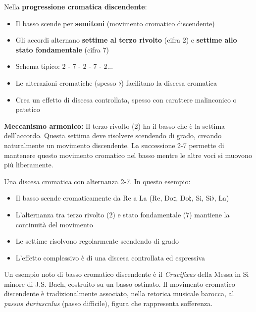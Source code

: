 \begin{regola}
	\label{reg:progressione_cromatica_disc}
	Nella \textbf{progressione cromatica discendente}:
	
	\begin{itemize}
		\item Il basso scende per \textbf{semitoni} (movimento cromatico discendente)
		\item Gli accordi alternano \textbf{settime al terzo rivolto} (cifra 2) e \textbf{settime allo stato fondamentale} (cifra 7)
		\item Schema tipico: 2 - 7 - 2 - 7 - 2...
		\item Le alterazioni cromatiche (spesso $\flat$) facilitano la discesa cromatica
		\item Crea un effetto di discesa controllata, spesso con carattere malinconico o patetico
	\end{itemize}
	
	\textbf{Meccanismo armonico:}
	Il terzo rivolto (2) ha il basso che è la settima dell'accordo. Questa settima deve risolvere scendendo di grado, creando naturalmente un movimento discendente. La successione 2-7 permette di mantenere questo movimento cromatico nel basso mentre le altre voci si muovono più liberamente.
\end{regola}

\begin{esempio}
	\label{ex:progressione_cromatica_disc}
	Una discesa cromatica con alternanza 2-7.
	In questo esempio:
	\begin{itemize}
		\item Il basso scende cromaticamente da Re a La (Re, Do$\sharp$, Do$\natural$, Si, Si$\flat$, La)
		\item L'alternanza tra terzo rivolto (2) e stato fondamentale (7) mantiene la continuità del movimento
		\item Le settime risolvono regolarmente scendendo di grado
		\item L'effetto complessivo è di una discesa controllata ed espressiva
	\end{itemize}
\end{esempio}

\begin{esempio}
	\label{ex:bach_27}
	Un esempio noto di basso cromatico discendente è il \textit{Crucifixus} della Messa in Si minore di J.S. Bach, costruito su un basso ostinato. Il movimento cromatico discendente è tradizionalmente associato, nella retorica musicale barocca, al \textit{passus duriusculus} (passo difficile), figura che rappresenta sofferenza.
\end{esempio}

